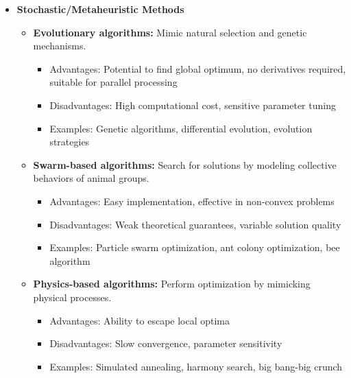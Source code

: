 \begin{itemize}
    \item \textbf{Stochastic/Metaheuristic Methods}
        \begin{itemize}
            \item \textbf{Evolutionary algorithms:} Mimic natural selection and genetic mechanisms.
                \begin{itemize}
                    \item Advantages: Potential to find global optimum, no derivatives required, suitable for parallel processing
                    \item Disadvantages: High computational cost, sensitive parameter tuning
                    \item Examples: Genetic algorithms, differential evolution, evolution strategies
                \end{itemize}
                
            \item \textbf{Swarm-based algorithms:} Search for solutions by modeling collective behaviors of animal groups.
                \begin{itemize}
                    \item Advantages: Easy implementation, effective in non-convex problems
                    \item Disadvantages: Weak theoretical guarantees, variable solution quality
                    \item Examples: Particle swarm optimization, ant colony optimization, bee algorithm
                \end{itemize}
                
            \item \textbf{Physics-based algorithms:} Perform optimization by mimicking physical processes.
                \begin{itemize}
                    \item Advantages: Ability to escape local optima
                    \item Disadvantages: Slow convergence, parameter sensitivity
                    \item Examples: Simulated annealing, harmony search, big bang-big crunch
                \end{itemize}
        \end{itemize}
    

\end{itemize}
